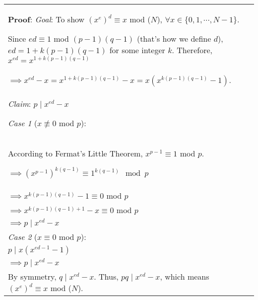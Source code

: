 {\tabulinesep=1mm
\begin{tabu}{|p{16cm} |}
\hline
\textbf{Proof}:
\textit{Goal}: To show $(x^e)^d \equiv x$ mod ($N$), $\forall x \in \{0, 1, \cdots, N-1\}$. 

Since $ed \equiv 1$ mod $(p-1)(q-1)$ (that's how we define $d$), 
$ed = 1 + k(p-1)(q-1)$ for some integer $k$. 
Therefore, $x^{ed} = x^{1 + k(p-1)(q-1)}$\\
$\implies x^{ed} - x = x^{1 + k(p-1)(q-1)} - x = x(x^{k(p-1)(q-1)} - 1)$. \\ 
\textit{Claim}: $p \mid x^{ed} - x$

\textit{Case 1} ($x \not\equiv 0$ mod $p$): \\
According to Fermat's Little Theorem, $x^{p-1} \equiv 1$ mod $p$. 


$\implies (x^{p-1})^{k(q-1)} \equiv 1^{k(q-1)} \mod p$ \\
$\implies x^{k(p-1)(q-1)} - 1 \equiv 0$ mod $p$  \\
$\implies x^{k(p-1)(q-1)+1} - x \equiv 0$ mod $p$\\
$\implies p \mid x^{ed} - x$\\
\textit{Case 2} ($x \equiv 0$ mod $p$): \\
$p \mid x(x^{ed - 1} - 1)$ \\ 
$\implies p \mid x^{ed} - x$\\
By symmetry, $q \mid x^{ed} - x$. Thus, $pq \mid x^{ed} - x$, which means $(x^e)^d \equiv x$ mod ($N$). \\
\hline
\end{tabu}
}